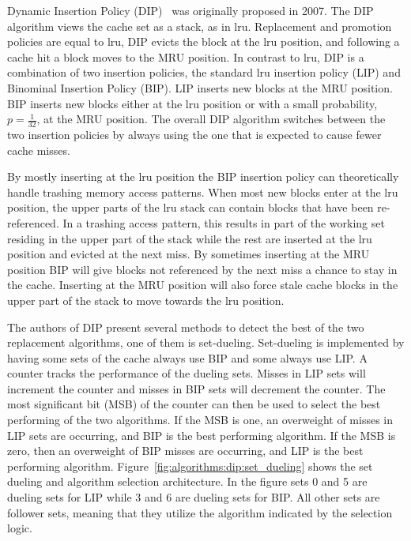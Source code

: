 Dynamic Insertion Policy (DIP)~\cite{Qureshi2007} was originally proposed in 2007.
The DIP algorithm views the cache set as a stack, as in \gls{lru}.
Replacement and promotion policies are equal to \gls{lru}, DIP evicts the block at the \gls{lru} position, and following a cache hit a block moves to the MRU position.
In contrast to \gls{lru}, DIP is a combination of two insertion policies, the standard \gls{lru} insertion policy (LIP) and Binominal Insertion Policy (BIP).
LIP inserts new blocks at the MRU position.
BIP inserts new blocks either at the \gls{lru} position or with a small probability, $p = \frac{1}{32}$, at the MRU position. 
The overall DIP algorithm switches between the two insertion policies by always using the one that is expected to cause fewer cache misses.

By mostly inserting at the \gls{lru} position the BIP insertion policy can theoretically handle trashing memory access patterns.
When most new blocks enter at the \gls{lru} position, the upper parts of the \gls{lru} stack can contain blocks that have been re-referenced.
In a trashing access pattern, this results in part of the working set residing in the upper part of the stack while the rest are inserted at the \gls{lru} position and evicted at the next miss.
By sometimes inserting at the MRU position BIP will give blocks not referenced by the next miss a chance to stay in the cache. 
Inserting at the MRU position will also force stale cache blocks in the upper part of the stack to move towards the \gls{lru} position.

The authors of DIP present several methods to detect the best of the two replacement algorithms, one of them is set-dueling.
Set-dueling is implemented by having some sets of the cache always use BIP and some always use LIP.
A counter tracks the performance of the dueling sets.
Misses in LIP sets will increment the counter and misses in BIP sets will decrement the counter.
The most significant bit (MSB) of the counter can then be used to select the best performing of the two algorithms.
If the MSB is one, an overweight of misses in LIP sets are occurring, and BIP is the best performing algorithm. 
If the MSB is zero, then an overweight of BIP misses are occurring, and LIP is the best performing algorithm.
Figure~\ref{fig:algorithms:dip:set_dueling} shows the set dueling and algorithm selection architecture.
In the figure sets 0 and 5 are dueling sets for LIP while 3 and 6 are dueling sets for BIP.
All other sets are follower sets, meaning that they utilize the algorithm indicated by the selection logic.


